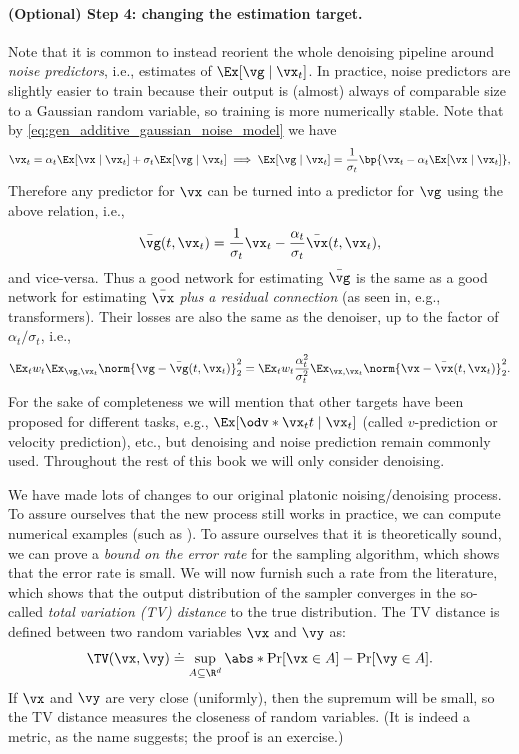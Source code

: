 \documentclass[../../book-main.tex]{subfiles}
\begin{document}
\paragraph{(Optional) Step 4: changing the estimation target.} Note that it is common to instead reorient the whole denoising pipeline around \textit{noise predictors}, i.e., estimates of \(\Ex[\vg \mid \vx_{t}]\). In practice, noise predictors are slightly easier to train because their output is (almost) always of comparable size to a Gaussian random variable, so training is more numerically stable. Note that by \eqref{eq:gen_additive_gaussian_noise_model} we have 
\begin{equation}
	\vx_{t} = \alpha_{t}\Ex[\vx \mid \vx_{t}] + \sigma_{t}\Ex[\vg \mid \vx_{t}] \implies \Ex[\vg \mid \vx_{t}] = \frac{1}{\sigma_{t}}\bp{\vx_{t} - \alpha_{t}\Ex[\vx \mid \vx_{t}]},
\end{equation}
Therefore any predictor for \(\vx\) can be turned into a predictor for \(\vg\) using the above relation, i.e.,
\begin{equation}
	\bar{\vg}(t, \vx_{t}) = \frac{1}{\sigma_{t}}\vx_{t} - \frac{\alpha_{t}}{\sigma_{t}}\bar{\vx}(t, \vx_{t}),
\end{equation}
and vice-versa. Thus a good network for estimating \(\bar{\vg}\) is the same as a good network for estimating \(\bar{\vx}\) \textit{plus a residual connection} (as seen in, e.g., transformers). Their losses are also the same as the denoiser, up to the factor of \(\alpha_{t}/\sigma_{t}\), i.e.,
\begin{equation}
	\Ex_{t}w_{t}\Ex_{\vg, \vx_{t}}\norm{\vg - \bar{\vg}(t, \vx_{t})}_{2}^{2} = \Ex_{t}w_{t}\frac{\alpha_{t}^{2}}{\sigma_{t}^{2}}\Ex_{\vx, \vx_{t}}\norm{\vx - \bar{\vx}(t, \vx_{t})}_{2}^{2}.
\end{equation}
For the sake of completeness we will mention that other targets have been proposed for different tasks, e.g., \(\Ex[\odv*{\vx_{t}}{t} \mid \vx_{t}]\) (called \(v\)-prediction or velocity prediction), etc., but denoising and noise prediction remain commonly used. Throughout the rest of this book we will only consider denoising.


We have made lots of changes to our original platonic noising/denoising process. To assure ourselves that the new process still works in practice, we can compute numerical examples (such as ). To assure ourselves that it is theoretically sound, we can prove a \textit{bound on the error rate} for the sampling algorithm, which shows that the error rate is small. We will now furnish such a rate from the literature, which shows that the output distribution of the sampler converges in the so-called \textit{total variation (TV) distance} to the true distribution. The TV distance is defined between two random variables \(\vx\) and \(\vy\) as:
\begin{equation}
	\TV(\vx, \vy) \doteq \sup_{A \subseteq \R^{d}}\abs*{\Pr[\vx \in A] - \Pr[\vy \in A]}.
\end{equation}
If \(\vx\) and \(\vy\) are very close (uniformly), then the supremum will be small, so the TV distance measures the closeness of random variables. (It is indeed a metric, as the name suggests; the proof is an exercise.)
\end{document}
